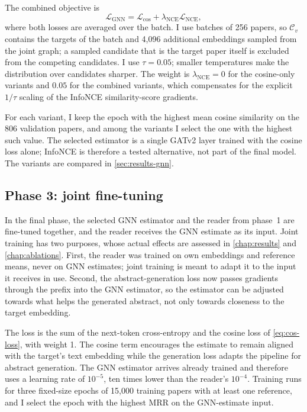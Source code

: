 The combined objective is
\[
  \mathcal{L}_{\mathrm{GNN}} = \mathcal{L}_{\cos} + \lambda_{\mathrm{NCE}} \mathcal{L}_{\mathrm{NCE}},
\]
where both losses are averaged over the batch. I use batches of 256 papers, so $\mathcal{C}_v$ contains the targets of the batch and 4,096 additional embeddings sampled from the joint graph; a sampled candidate that is the target paper itself is excluded from the competing candidates. I use $\tau = 0.05$; smaller temperatures make the distribution over candidates sharper. The weight is $\lambda_{\mathrm{NCE}} = 0$ for the cosine-only variants and $0.05$ for the combined variants, which compensates for the explicit $1/\tau$ scaling of the InfoNCE similarity-score gradients.

For each variant, I keep the epoch with the highest mean cosine similarity on the 806 validation papers, and among the variants I select the one with the highest such value. The selected estimator is a single GATv2 layer trained with the cosine loss alone; InfoNCE is therefore a tested alternative, not part of the final model. The variants are compared in \autoref{sec:results-gnn}.

\subsection{Phase 3: joint fine-tuning}
\label{sec:training-joint}

In the final phase, the selected GNN estimator and the reader from phase~1 are fine-tuned together, and the reader receives the GNN estimate as its input. Joint training has two purposes, whose actual effects are assessed in \autoref{chap:results} and \autoref{chap:ablations}. First, the reader was trained on own embeddings and reference means, never on GNN estimates; joint training is meant to adapt it to the input it receives in use. Second, the abstract-generation loss now passes gradients through the prefix into the GNN estimator, so the estimator can be adjusted towards what helps the generated abstract, not only towards closeness to the target embedding.

The loss is the sum of the next-token cross-entropy and the cosine loss of \autoref{eq:cos-loss}, with weight 1. The cosine term encourages the estimate to remain aligned with the target's text embedding while the generation loss adapts the pipeline for abstract generation. The GNN estimator arrives already trained and therefore uses a learning rate of $10^{-5}$, ten times lower than the reader's $10^{-4}$. Training runs for three fixed-size epochs of 15,000 training papers with at least one reference, and I select the epoch with the highest MRR on the GNN-estimate input.
